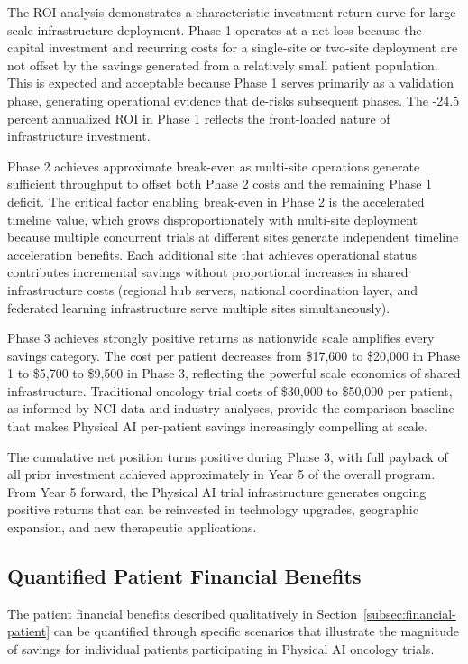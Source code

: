 The ROI analysis demonstrates a characteristic investment-return curve for
large-scale infrastructure deployment. Phase 1 operates at a net loss because
the capital investment and recurring costs for a single-site or two-site
deployment are not offset by the savings generated from a relatively small
patient population. This is expected and acceptable because Phase 1 serves
primarily as a validation phase, generating operational evidence that
de-risks subsequent phases. The -24.5 percent annualized ROI in Phase 1
reflects the front-loaded nature of infrastructure investment.

Phase 2 achieves approximate break-even as multi-site operations generate
sufficient throughput to offset both Phase 2 costs and the remaining Phase 1
deficit. The critical factor enabling break-even in Phase 2 is the accelerated
timeline value, which grows disproportionately with multi-site deployment
because multiple concurrent trials at different sites generate independent
timeline acceleration benefits. Each additional site that achieves operational
status contributes incremental savings without proportional increases in shared
infrastructure costs (regional hub servers, national coordination layer, and
federated learning infrastructure serve multiple sites simultaneously).

Phase 3 achieves strongly positive returns as nationwide scale amplifies every
savings category. The cost per patient decreases from \$17,600 to \$20,000 in
Phase 1 to \$5,700 to \$9,500 in Phase 3, reflecting the powerful scale
economics of shared infrastructure. Traditional oncology trial costs of
\$30,000 to \$50,000 per patient, as informed by NCI data
\cite{nci-trials-paying} and industry analyses, provide the comparison baseline
that makes Physical AI per-patient savings increasingly compelling at scale.

The cumulative net position turns positive during Phase 3, with full payback
of all prior investment achieved approximately in Year 5 of the overall
program. From Year 5 forward, the Physical AI trial infrastructure generates
ongoing positive returns that can be reinvested in technology upgrades,
geographic expansion, and new therapeutic applications.

\subsection{Quantified Patient Financial Benefits}
\label{subsec:financial-patient-quantified}

The patient financial benefits described qualitatively in
Section~\ref{subsec:financial-patient} can be quantified through specific
scenarios that illustrate the magnitude of savings for individual patients
participating in Physical AI oncology trials.

